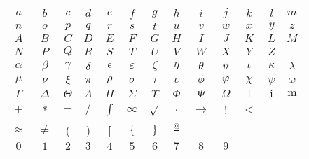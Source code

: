 \documentclass[20pt]{extreport}
\begin{document}
\begin{center}
	\begin{tabular}{ c c c c c c c c c c c c c }
		\( a \) & \( b \) & \( c \) & \( d \) & \( e \) & \( f \) & \( g \) & \( h \) & \( i \) & \( j \) & \( k \) & \( l \) & \( m \) \\ 
		\( n \) & \( o \) & \( p \) & \( q \) & \( r \) & \( s \) & \( t \) & \( u \) & \( v \) & \( w \) & \( x \) & \( y \) & \( z \)\\  

		\( A \) & \( B \) & \( C \) & \( D \) & \( E \) & \( F \) & \( G \) & \( H \) & \( I \) & \( J \) & \( K \) & \( L \) & \( M \)\\ 

		\( N \) & \( P \) & \( Q \) & \( R \) & \( S \) & \( T \) & \( U \) & \( V \) & \( W \) & \( X \) & \( Y \) & \( Z \)\\ 

		\(\alpha\) & \( \beta \) & \( \gamma \) & \( \delta \) & \( \epsilon \) & \(\varepsilon \) & \( \zeta \) & \( \eta \) & \( \theta \) & \(\vartheta\) & \( \iota \) & \( \kappa \) & \( \lambda \)\\
		
		\( \mu\) & \(\nu \) & \(\xi\) & \(\pi\) & \(\rho\) & \(\sigma \) & \(\tau \) & \(\upsilon \) & \(\phi \) & \(\varphi\)& \(\chi \) & \(\psi \) & \(\omega \) \\
		
		\(\Gamma \) & \(\Delta \) & \(\Theta\) & \(\Lambda\) & \(\Pi\) & \(\Sigma\) & \(\Upsilon\) & \(\Phi\) & \(\Psi\) & \(\Omega\) & \(\mathrm{l}\) & \(\mathrm{i}\) & \(\mathrm{m}\) \\
		
		\(+\) & \(*\) & \(-\) & \( / \) & \(\int \) & \(\infty \) & \(\sqrt{} \) & \(.\) & \(\rightarrow \) & ! & \(<\)  \\
		
		\(\approx \) & \(\neq \) & ( & ) & [ & \(\{ \) & \( \} \) & \(\frac{@}{}\) \\
		
		\( 0 \) & \( 1 \) & \( 2 \) & \( 3 \) & \( 4 \) & \( 5 \) & \( 6 \) & \( 7 \) & \( 8 \) & \( 9 \)\\
	\end{tabular}
\end{center}
\end{document}
